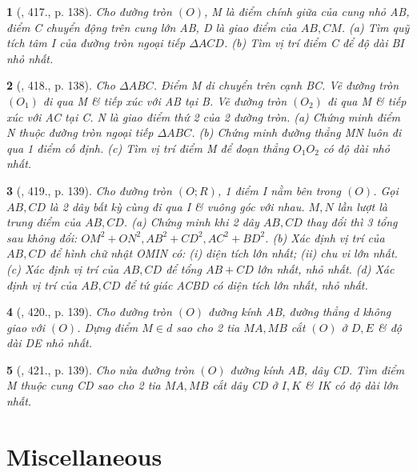 \documentclass{article}
\newtheorem{baitoan}{}
\begin{document}
\begin{baitoan}[\cite{Binh_Toan_9_tap_2}, 417., p. 138]
	Cho đường tròn $(O)$, M là điểm chính giữa của cung nhỏ AB, điểm C chuyển động trên cung lớn AB, D là giao điểm của $AB,CM$. (a) Tìm quỹ tích tâm I của đường tròn ngoại tiếp $\Delta ACD$. (b) Tìm vị trí điểm C để độ dài BI nhỏ nhất.
\end{baitoan}

\begin{baitoan}[\cite{Binh_Toan_9_tap_2}, 418., p. 138]
	Cho $\Delta ABC$. Điểm M di chuyển trên cạnh BC. Vẽ đường tròn $(O_1)$ đi qua M \& tiếp xúc với AB tại B. Vẽ đường tròn $(O_2)$ đi qua M \& tiếp xúc với AC tại C. N là giao điểm thứ 2 của 2 đường tròn. (a) Chứng minh điểm N thuộc đường tròn ngoại tiếp $\Delta ABC$. (b) Chứng minh đường thẳng MN luôn đi qua 1 điểm cố định. (c) Tìm vị trí điểm M để đoạn thẳng $O_1O_2$ có độ dài nhỏ nhất.
\end{baitoan}

\begin{baitoan}[\cite{Binh_Toan_9_tap_2}, 419., p. 139]
	Cho đường tròn $(O;R)$, 1 điểm I nằm bên trong $(O)$. Gọi $AB,CD$ là 2 dây bất kỳ cùng đi qua I \& vuông góc với nhau. $M,N$ lần lượt là trung điểm của $AB,CD$. (a) Chứng minh khi 2 dây $AB,CD$ thay đổi thì 3 tổng sau không đổi: $OM^2 + ON^2,AB^2 + CD^2,AC^2 + BD^2$. (b) Xác định vị trí của $AB,CD$ để hình chữ nhật OMIN có: (i) diện tích lớn nhất; (ii) chu vi lớn nhất. (c) Xác định vị trí của $AB,CD$ để tổng $AB + CD$ lớn nhất, nhỏ nhất. (d) Xác định vị trí của $AB,CD$ để tứ giác ACBD có diện tích lớn nhất, nhỏ nhất.
\end{baitoan}

\begin{baitoan}[\cite{Binh_Toan_9_tap_2}, 420., p. 139]
	Cho đường tròn $(O)$ đường kính AB, đường thẳng d không giao với $(O)$. Dựng điểm $M\in d$ sao cho 2 tia $MA,MB$ cắt $(O)$ ở $D,E$ \& độ dài DE nhỏ nhất.
\end{baitoan}

\begin{baitoan}[\cite{Binh_Toan_9_tap_2}, 421., p. 139]
	Cho nửa đường tròn $(O)$ đường kính AB, dây CD. Tìm điểm M thuộc cung CD sao cho 2 tia $MA,MB$ cắt dây CD ở $I,K$ \& IK có độ dài lớn nhất.
\end{baitoan}


\section{Miscellaneous}
\end{document}
